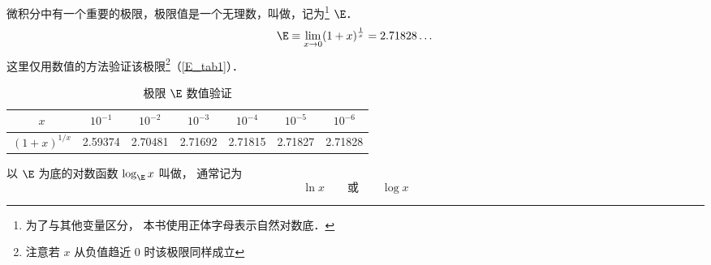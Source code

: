 

微积分中有一个重要的极限，极限值是一个无理数，叫做，记为\footnote{为了与其他变量区分， 本书使用正体字母表示自然对数底．} $\E$．
\begin{equation}\label{E_eq1}
\E \equiv \lim_{x \to 0} (1 + x)^{\frac{1}{x}} = 2.71828\dots
\end{equation}
这里仅用数值的方法验证该极限\footnote{注意若 $x$ 从负值趋近 $0$ 时该极限同样成立}（\autoref{E_tab1}）．

\begin{table}[ht]
\centering
\caption{极限 $\E$ 数值验证}\label{E_tab1}
\begin{tabular}{|c|c|c|c|c|c|c|}
\hline
$x$ & $10^{-1}$ & $10^{-2}$ & $10^{-3}$ & $10^{-4}$ & $10^{-5}$ & $10^{-6}$ \\
\hline
$(1 + x)^{1/x}$ & 2.59374 & 2.70481 & 2.71692 & 2.71815 & 2.71827 & 2.71828 \\
\hline
\end{tabular}
\end{table}


以 $\E$ 为底的对数函数 $\log_{\E} x$ 叫做， 通常记为
\begin{equation}
\ln x \qquad \text{或} \qquad \log x
\end{equation}


